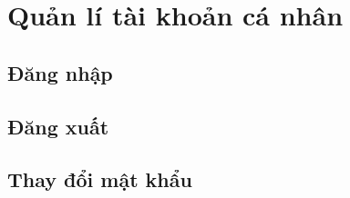 \section{Quản lí tài khoản cá nhân}

\subsection{Đăng nhập}

\subsection{Đăng xuất}

\subsection{Thay đổi mật khẩu} 